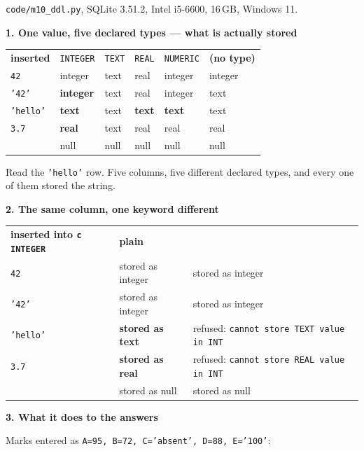 \begin{measured}
\textsf{\footnotesize \texttt{code/m10\_ddl.py}, SQLite 3.51.2, Intel i5-6600,
16\,GB, Windows 11.}

\medskip
\textbf{1. One value, five declared types --- what is actually stored}

\begin{tabular}{@{}L{2.8cm}L{2.0cm}L{1.8cm}L{1.8cm}L{2.2cm}L{2.2cm}@{}}
\textbf{inserted} & \texttt{INTEGER} & \texttt{TEXT} & \texttt{REAL} &
\texttt{NUMERIC} & \textbf{(no type)} \\
\texttt{42} & integer & text & real & integer & integer \\
\texttt{'42'} & \textbf{integer} & text & real & integer & text \\
\texttt{'hello'} & \textbf{text} & text & \textbf{text} & \textbf{text} & text \\
\texttt{3.7} & \textbf{real} & text & real & real & real \\
 & null & null & null & null & null \\
\end{tabular}

\smallskip
Read the \texttt{'hello'} row. Five columns, five different declared types,
and every one of them stored the string.

\medskip
\textbf{2. The same column, one keyword different}

\begin{tabular}{@{}L{3.4cm}L{4.4cm}L{6.0cm}@{}}
\textbf{inserted into \texttt{c INTEGER}} & \textbf{plain} & \textbf{} \\
\texttt{42}      & stored as integer & stored as integer \\
\texttt{'42'}    & stored as integer & stored as integer \\
\texttt{'hello'} & \textbf{stored as text} & refused: \texttt{cannot store TEXT value in INT} \\
\texttt{3.7}     & \textbf{stored as real} & refused: \texttt{cannot store REAL value in INT} \\
     & stored as null & stored as null \\
\end{tabular}

\medskip
\textbf{3. What it does to the answers}

Marks entered as \texttt{A=95, B=72, C='absent', D=88, E='100'}:


\end{measured}
